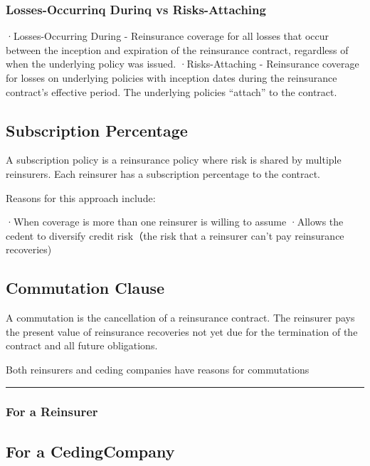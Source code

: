 \documentclass[
]{article}
\begin{document}
\subsubsection{Losses-Occurrinq Durinq vs
Risks-Attaching}\label{losses-occurrinq-durinq-vs-risks-attaching}

·Losses-Occurring During - Reinsurance coverage for all losses that
occur between the inception and expiration of the reinsurance contract,
regardless of when the underlying policy was issued. ·Risks-Attaching -
Reinsurance coverage for losses on underlying policies with inception
dates during the reinsurance contract's effective period. The underlying
policies ``attach'' to the contract.

\subsection{Subscription Percentage}\label{subscription-percentage}

A subscription policy is a reinsurance policy where risk is shared by
multiple reinsurers. Each reinsurer has a subscription percentage to the
contract.

Reasons for this approach include:

·When coverage is more than one reinsurer is willing to assume ·Allows
the cedent to diversify credit risk（the risk that a reinsurer can't pay
reinsurance recoveries)

\subsection{Commutation Clause}\label{commutation-clause}

A commutation is the cancellation of a reinsurance contract. The
reinsurer pays the present value of reinsurance recoveries not yet due
for the termination of the contract and all future obligations.

Both reinsurers and ceding companies have reasons for commutations

\begin{center}\rule{0.5\linewidth}{0.5pt}\end{center}

\subsubsection{For a Reinsurer}\label{for-a-reinsurer}

\subsection{For a CedingCompany}\label{for-a-cedingcompany}
\end{document}
